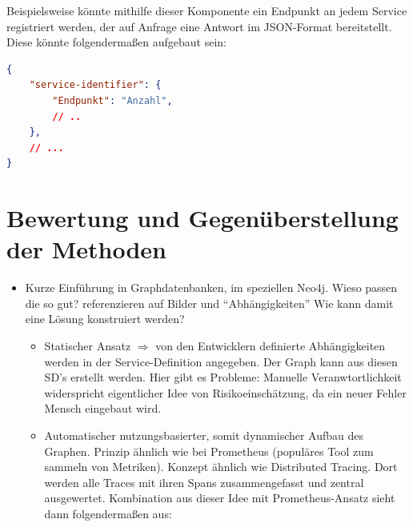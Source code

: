 Beispielsweise könnte mithilfe dieser Komponente ein Endpunkt an jedem Service registriert werden, der auf Anfrage eine Antwort im JSON-Format bereitstellt. Diese könnte folgendermaßen aufgebaut sein:

\begin{lstlisting}[language=json, caption={Antwort über Nutzung anderer Services}]
{
	"service-identifier": {
		"Endpunkt": "Anzahl",
		// ..
	},
	// ...
}
\end{lstlisting}

\section{Bewertung und Gegenüberstellung der Methoden}

\begin{itemize}
	\item Kurze Einführung in Graphdatenbanken, im speziellen Neo4j. Wieso passen die so gut? referenzieren auf Bilder und \enquote{Abhängigkeiten} Wie kann damit eine Lösung konstruiert werden?
	\begin{itemize}
		\item Statischer Ansatz $\Rightarrow$ von den Entwicklern definierte Abhängigkeiten werden in der Service-Definition angegeben. Der Graph kann aus diesen SD's erstellt werden. Hier gibt es Probleme: Manuelle Veranwtortlichkeit widerspricht eigentlicher Idee von Risikoeinschätzung, da ein neuer Fehler Mensch eingebaut wird.
		\item Automatischer nutzungsbasierter, somit dynamischer Aufbau des Graphen. Prinzip ähnlich wie bei Prometheus (populäres Tool zum sammeln von Metriken). Konzept ähnlich wie Distributed Tracing. Dort werden alle Traces mit ihren Spans zusammengefasst und zentral ausgewertet. Kombination aus dieser Idee mit Prometheus-Ansatz sieht dann folgendermaßen aus:
		

\end{itemize}
\end{itemize}
